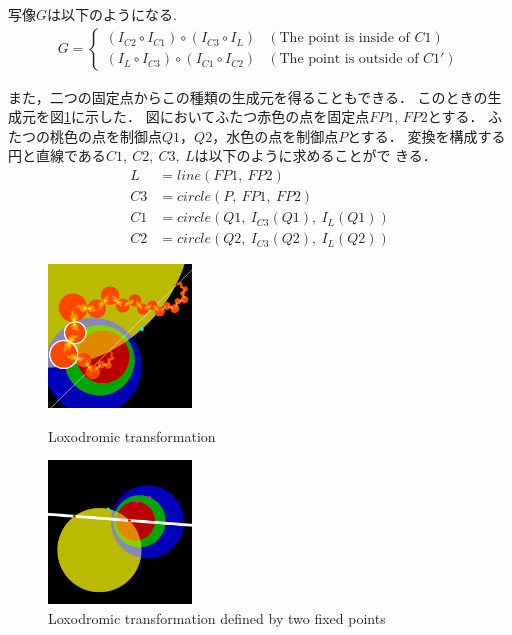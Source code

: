 写像$G$は以下のようになる.
\begin{align*}
G =
\begin{cases}
 (I_{C2} \circ I_{C1}) \circ (I_{C3} \circ I_L) & (\text{The point is inside of } C1) \\
 (I_L \circ I_{C3}) \circ (I_{C1} \circ I_{C2}) & (\text{The point is outside of }C1')
\end{cases}
\end{align*}

また，二つの固定点からこの種類の生成元を得ることもできる．
このときの生成元を図\ref{fig:loxoFixed}に示した．
図においてふたつ赤色の点を固定点$FP1$, $FP2$とする．
ふたつの桃色の点を制御点$Q1$，$Q2$，水色の点を制御点$P$とする．
変換を構成する円と直線である$C1,~C2,~C3,~L$は以下のように求めることがで
きる．
\begin{align*}
 L &= line(FP1,~FP2)\\
 C3 &= circle(P,~FP1,~FP2)\\
 C1 &= circle(Q1,~I_{C3}(Q1),~I_{L}(Q1))\\
 C2 &= circle(Q2,~I_{C3}(Q2),~I_{L}(Q2))
\end{align*}

\begin{figure}[htbp]
 \begin{minipage}[t]{0.5\hsize}
  \center
   \includegraphics[width=1.5in, height=1.5in, keepaspectratio]{../img/klein/2diis/loxodromicEdged.pdf}
   \caption{Loxodromic transformation}
   \label{fig:loxodromic2d}
 \end{minipage}
 \begin{minipage}[t]{0.5\hsize}
  \center
  \includegraphics[width=1.5in, height=1.5in,
  keepaspectratio]{../img/klein/2diis/loxodromicFromFixedPoints.pdf}
  \caption{Loxodromic transformation defined by two fixed points}
  \label{fig:loxoFixed}
 \end{minipage}
\end{figure}

